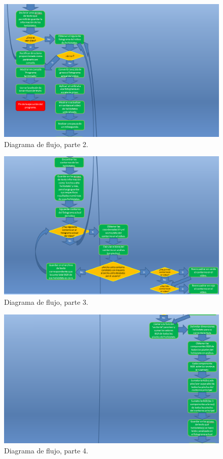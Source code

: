 \begin{figure}[h!]
  	\centering
	\includegraphics[width=\textwidth]{DiagramaFlujoSoftwareTFG/diagramaFlujo2.PNG}
	\caption{Diagrama de flujo, parte 2.
	\label{fig:DiagramaFlujoSoftwareTFG/diagramaFlujo2.PNG}}
\end{figure}

\begin{figure}[h!]
  	\centering
	\includegraphics[width=\textwidth]{DiagramaFlujoSoftwareTFG/diagramaFlujo3.PNG}
	\caption{Diagrama de flujo, parte 3.
	\label{fig:DiagramaFlujoSoftwareTFG/diagramaFlujo3.PNG}}
\end{figure}

\begin{figure}[h!]
  	\centering
	\includegraphics[width=\textwidth]{DiagramaFlujoSoftwareTFG/diagramaFlujo4.PNG}
	\caption{Diagrama de flujo, parte 4.
	\label{fig:DiagramaFlujoSoftwareTFG/diagramaFlujo4.PNG}}
\end{figure}

